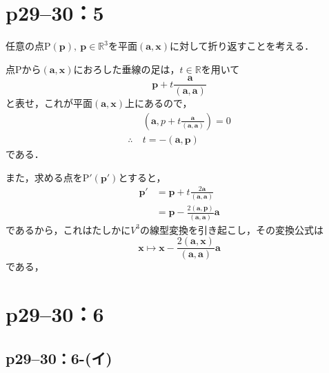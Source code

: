 \documentclass[a4paper,10pt,fleqn]{ltjsarticle}
\begin{document}
\section*{p29--30：5}

\begin{tleftbar}
    任意の点$\mathrm{P}(\bm{p}),~\bm{p} \in \mathbb{R}^3$を平面$(\bm{a},\bm{x})$に対して折り返すことを考える．

    点$\mathrm{P}$から$(\bm{a},\bm{x})$におろした垂線の足は，$t \in \mathbb{R}$を用いて
    \[
        \bm{p} + t \frac{\bm{a}}{(\bm{a},\bm{a})}
    \]
    と表せ，これが平面$(\bm{a},\bm{x})$上にあるので，
    \begin{align*}
                     & (\bm{a},p+t\frac{\bm{a}}{(\bm{a},\bm{a})})=0 \\
        \therefore ~ & t=- (\bm{a},\bm{p})
    \end{align*}
    である．

    また，求める点を$\mathrm{P}' (\bm{p}')$とすると，
    \begin{align*}
        \bm{p}' & = \bm{p}+t \frac{2\bm{a}}{(\bm{a},\bm{a})}               \\
                & = \bm{p}-\frac{2(\bm{a},\bm{p})}{(\bm{a},\bm{a})} \bm{a}
    \end{align*}
    であるから，これはたしかに$V^3$の線型変換を引き起こし，その変換公式は
    \[
        \bm{x} \mapsto \bm{x}-\frac{2(\bm{a},\bm{x})}{(\bm{a},\bm{a})} \bm{a}
    \]
    である，
\end{tleftbar}

\newpage

\section*{p29--30：6}

\subsection*{p29--30：6-(イ)}
\end{document}
